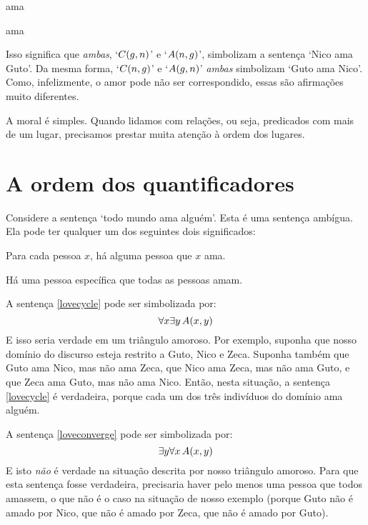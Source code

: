 \begin{center}
	\begin{ekey}
		\item[\atom{A}{x,y}]  ama 
		\item[\atom{C}{x,y}]  ama 
	\end{ekey}
\end{center}
Isso significa que \emph{ambas}, `$\mathord{C}(g,n)$' e `$\mathord{A}(n,g)$',  simbolizam a sentença `Nico ama Guto'.
Da mesma forma, `$\mathord{C}(n,g)$' e `$\mathord{A}(g,n)$'
\emph{ambas} simbolizam `Guto ama Nico'.
Como, infelizmente, o amor pode não ser correspondido, essas são afirmações muito diferentes.

A moral é simples. Quando lidamos com relações, ou seja, predicados com mais de um lugar, precisamos prestar muita atenção à ordem dos lugares.


\section{A ordem dos quantificadores}
\label{ss:OrderQuant}
Considere a sentença `todo mundo ama alguém'.
Esta é uma sentença ambígua.
Ela pode ter qualquer um dos seguintes dois significados:
	\begin{earg}
		\item[\ex{lovecycle}] Para cada pessoa $x$, há alguma pessoa que $x$ ama.
		\item[\ex{loveconverge}] Há uma pessoa específica que todas as pessoas amam.
	\end{earg}
A sentença \ref{lovecycle} pode ser simbolizada por:
$$\forall x \exists y\, \mathord{A}(x,y)$$
E isso seria verdade em um triângulo amoroso.
Por exemplo, suponha que nosso domínio do discurso esteja restrito a Guto, Nico e Zeca.
Suponha também que Guto ama Nico, mas não ama Zeca, que Nico ama Zeca, mas não ama Guto, e que Zeca ama Guto, mas não ama Nico.
Então, nesta situação, a sentença \ref{lovecycle} é verdadeira, porque cada um dos três indivíduos do domínio ama alguém.

A sentença \ref{loveconverge} pode ser simbolizada por:
$$\exists y \forall x\, \mathord{A}(x,y)$$
E isto \emph{não} é verdade na situação descrita por nosso triângulo amoroso.
Para que esta sentença fosse verdadeira, precisaria haver pelo menos uma pessoa que todos amassem, o que não é o caso na situação de nosso exemplo (porque Guto não é amado por Nico, que não é amado por Zeca, que não é amado por Guto).

